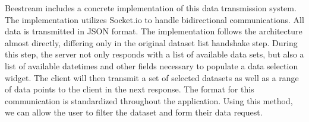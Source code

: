 Beestream includes a concrete implementation of this data transmission system.  The implementation utilizes Socket.io to handle bidirectional communications.  All data is transmitted in JSON format.  The implementation follows the architecture almost directly, differing only in the original dataset list handshake step.  During this step, the server not only responds with a list of available data sets, but also a list of available datetimes and other fields necessary to populate a data selection widget.  The client will then transmit a set of selected datasets as well as a range of data points to the client in the next response.  The format for this communication is standardized throughout the application.  Using this method, we can allow the user to filter the dataset and form their data request. \par
